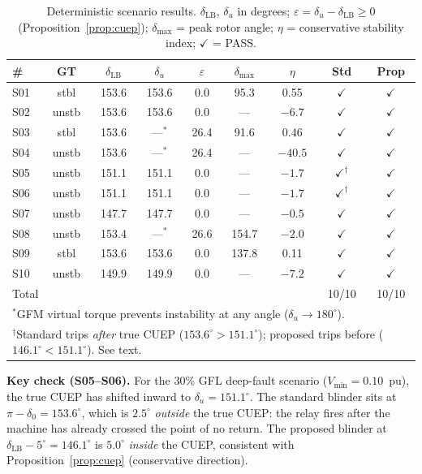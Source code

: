 \documentclass[11pt,a4paper]{article}
\newcommand{\dz}{\delta_0}         %
\newcommand{\du}{\delta_u}         %
\newcommand{\dlb}{\delta_{\mathrm{LB}}}   %
\begin{document}
\begin{table}[ht]
  \centering
  \caption{Deterministic scenario results.  $\dlb$, $\du$ in degrees;
  $\varepsilon = \du - \dlb \geq 0$ (Proposition~\ref{prop:cuep});
  $\delta_{\max}$ = peak rotor angle; $\eta$ = conservative stability index;
  $\checkmark$ = PASS.}
  \label{tab:det_results}
  \small
  \begin{tabular}{lcccccccc}
    \toprule
    \#  & GT & $\dlb$ & $\du$ & $\varepsilon$ & $\delta_{\max}$
        & $\eta$ & Std & Prop \\
    \midrule
    S01 & stbl  & 153.6 & 153.6 &  0.0 &  95.3 &  0.55 & $\checkmark$ & $\checkmark$ \\
    S02 & unstb & 153.6 & 153.6 &  0.0 & ---   & $-6.7$& $\checkmark$ & $\checkmark$ \\
    S03 & stbl  & 153.6 & ---$^*$& 26.4 &  91.6 &  0.46 & $\checkmark$ & $\checkmark$ \\
    S04 & unstb & 153.6 & ---$^*$& 26.4 & ---   &$-40.5$& $\checkmark$ & $\checkmark$ \\
    S05 & unstb & 151.1 & 151.1 &  0.0 & ---   & $-1.7$& $\checkmark^{\dagger}$ & $\checkmark$ \\
    S06 & unstb & 151.1 & 151.1 &  0.0 & ---   & $-1.7$& $\checkmark^{\dagger}$ & $\checkmark$ \\
    S07 & unstb & 147.7 & 147.7 &  0.0 & ---   & $-0.5$& $\checkmark$ & $\checkmark$ \\
    S08 & unstb & 153.4 & ---$^*$& 26.6 & 154.7 & $-2.0$& $\checkmark$ & $\checkmark$ \\
    S09 & stbl  & 153.6 & 153.6 &  0.0 & 137.8 &  0.11 & $\checkmark$ & $\checkmark$ \\
    S10 & unstb & 149.9 & 149.9 &  0.0 & ---   & $-7.2$& $\checkmark$ & $\checkmark$ \\
    \midrule
    \multicolumn{7}{l}{Total} & 10/10 & 10/10 \\
    \bottomrule
    \multicolumn{9}{l}{\scriptsize $^*$GFM virtual torque prevents instability at any angle ($\du \to 180^\circ$).} \\
    \multicolumn{9}{l}{\scriptsize $^\dagger$Standard trips \emph{after} true CUEP ($153.6^\circ > 151.1^\circ$);
    proposed trips before ($146.1^\circ < 151.1^\circ$). See text.}
  \end{tabular}
\end{table}

\textbf{Key check (S05--S06).}  For the 30\% GFL deep-fault scenario
($V_{\min} = 0.10$~pu), the true CUEP has shifted inward to
$\du = 151.1^\circ$.  The standard blinder sits at $\pi - \dz = 153.6^\circ$,
which is $2.5^\circ$ \emph{outside} the true CUEP: the relay fires after the
machine has already crossed the point of no return.  The proposed blinder at
$\dlb - 5^\circ = 146.1^\circ$ is $5.0^\circ$ \emph{inside} the CUEP,
consistent with Proposition~\ref{prop:cuep} (conservative direction).
\end{document}
